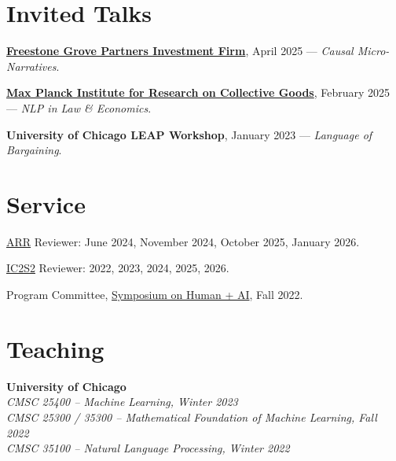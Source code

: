 \documentclass[11pt,letterpaper]{article}
\begin{document}
\section*{Invited Talks}
\begin{cvitems}

\item \href{https://fgrovep.com}{\textbf{Freestone Grove Partners Investment Firm}}, April 2025 --- \textit{Causal Micro-Narratives}.


\item \href{https://www.coll.mpg.de}{\textbf{Max Planck Institute for Research on Collective Goods}}, February 2025 --- \textit{NLP in Law \& Economics}.


\item \textbf{University of Chicago LEAP Workshop}, January 2023 --- \textit{Language of Bargaining}.
    
\end{cvitems}

\section*{Service}

\begin{cvitems}
    \item \href{https://aclrollingreview.org}{ARR} Reviewer: June 2024, November 2024, October 2025, January 2026.
    \item \href{https://ic2s2-2026.org}{IC2S2} Reviewer: 2022, 2023, 2024, 2025, 2026.
    \item Program Committee, \href{https://datascience.uchicago.edu/events/human-ai-conference/}{Symposium on Human + AI}, Fall 2022.
\end{cvitems}

\section*{Teaching}

\textbf{University of Chicago}\\
\hspace*{2em}\textit{CMSC 25400 -- Machine Learning, Winter 2023}\\
\hspace*{2em}\textit{CMSC 25300 / 35300 -- Mathematical Foundation of Machine Learning, Fall 2022}\\
\hspace*{2em}\textit{CMSC 35100 -- Natural Language Processing, Winter 2022}
\end{document}
